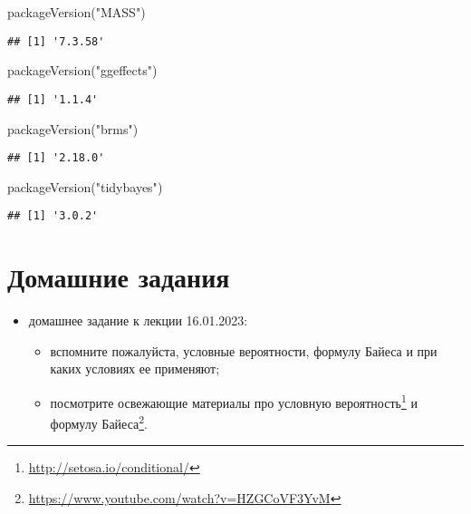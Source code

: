 \documentclass[
]{book}
\newenvironment{Shaded}{\begin{snugshade}}{\end{snugshade}}
\newcommand{\FunctionTok}[1]{\textcolor[rgb]{0.00,0.00,0.00}{#1}}
\newcommand{\NormalTok}[1]{#1}
\newcommand{\StringTok}[1]{\textcolor[rgb]{0.31,0.60,0.02}{#1}}
\providecommand{\tightlist}{%
  \setlength{\itemsep}{0pt}\setlength{\parskip}{0pt}}
\renewcommand{\href}[2]{#2\footnote{\url{#1}}}
\begin{document}
\begin{Shaded}
\begin{Highlighting}[]
\FunctionTok{packageVersion}\NormalTok{(}\StringTok{"MASS"}\NormalTok{)}
\end{Highlighting}
\end{Shaded}

\begin{verbatim}
## [1] '7.3.58'
\end{verbatim}

\begin{Shaded}
\begin{Highlighting}[]
\FunctionTok{packageVersion}\NormalTok{(}\StringTok{"ggeffects"}\NormalTok{)}
\end{Highlighting}
\end{Shaded}

\begin{verbatim}
## [1] '1.1.4'
\end{verbatim}

\begin{Shaded}
\begin{Highlighting}[]
\FunctionTok{packageVersion}\NormalTok{(}\StringTok{"brms"}\NormalTok{)}
\end{Highlighting}
\end{Shaded}

\begin{verbatim}
## [1] '2.18.0'
\end{verbatim}

\begin{Shaded}
\begin{Highlighting}[]
\FunctionTok{packageVersion}\NormalTok{(}\StringTok{"tidybayes"}\NormalTok{)}
\end{Highlighting}
\end{Shaded}

\begin{verbatim}
## [1] '3.0.2'
\end{verbatim}

\hypertarget{ux434ux43eux43cux430ux448ux43dux438ux435-ux437ux430ux434ux430ux43dux438ux44f}{%
\section{Домашние задания}\label{ux434ux43eux43cux430ux448ux43dux438ux435-ux437ux430ux434ux430ux43dux438ux44f}}

\begin{itemize}
\tightlist
\item
  домашнее задание к лекции 16.01.2023:

  \begin{itemize}
  \tightlist
  \item
    вспомните пожалуйста, условные вероятности, формулу Байеса и при каких условиях ее применяют;
  \item
    посмотрите освежающие материалы про \href{http://setosa.io/conditional/}{условную вероятность} и \href{https://www.youtube.com/watch?v=HZGCoVF3YvM}{формулу Байеса}.
  \end{itemize}
\end{itemize}
\end{document}
